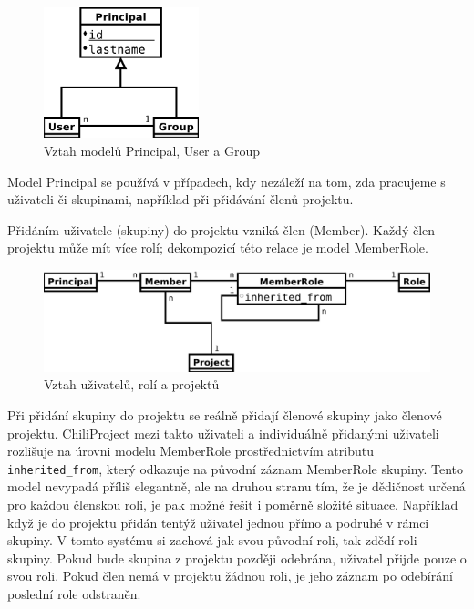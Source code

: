 \documentclass[thesis=B,czech]{FITthesis}[2012/05/02]
\begin{document}
\begin{figure}[htbp]
\centering
\includegraphics[width=0.4\textwidth]{group-er1.pdf}
\caption{Vztah modelů Principal, User a Group}
\end{figure}

Model Principal se používá v případech, kdy nezáleží na tom, zda pracujeme
s uživateli či skupinami, například při přidávání členů projektu.

Přidáním uživatele (skupiny) do projektu vzniká člen (Member). Každý
člen projektu může mít více rolí; dekompozicí této relace je model
\mbox{MemberRole}.

\begin{figure}[htbp]
\centering
\includegraphics[width=1\textwidth]{group-er2.pdf}
\caption{Vztah uživatelů, rolí a projektů}
\end{figure}

Při přidání skupiny do projektu se reálně přidají členové skupiny jako
členové projektu. ChiliProject mezi takto  uživateli a
individuálně přidanými uživateli rozlišuje na úrovni modelu MemberRole
prostřednictvím atributu \lstinline!inherited_from!, který odkazuje na
původní záznam MemberRole skupiny. Tento model nevypadá příliš
elegantně, ale na druhou stranu tím, že je dědičnost určená pro každou
členskou roli, je pak možné řešit i poměrně složité situace. Například
když je do projektu přidán tentýž uživatel jednou přímo a podruhé v rámci
skupiny. V tomto systému si zachová jak svou původní roli, tak zdědí roli
skupiny. Pokud bude skupina z projektu později odebrána, uživatel
přijde pouze o svou roli. Pokud člen nemá v projektu žádnou roli, je jeho
záznam po odebírání poslední role odstraněn.
\end{document}
